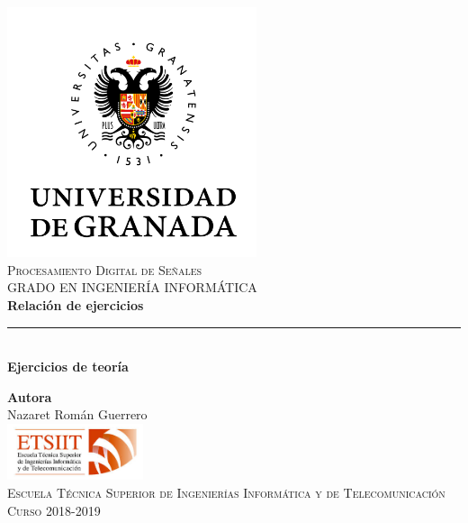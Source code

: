 \documentclass[11pt,a4paper]{article}
\begin{document}
\begin{titlepage}

\begin{minipage}{\textwidth}

\centering
\includegraphics[width=0.55\textwidth]{img/logo.png}\\

\textsc{\Large Procesamiento Digital de Señales\\[0.2cm]}
\textsc{GRADO EN INGENIERÍA INFORMÁTICA}\\[1cm]

{\Huge\bfseries Relación de ejercicios\\}
\noindent\rule[-1ex]{\textwidth}{3pt}\\[3.5ex]
{\large\bfseries Ejercicios de teoría}
\end{minipage}

\vspace{1.5cm}
\begin{minipage}{\textwidth}
\centering

\textbf{Autora}\\ {Nazaret Román Guerrero}\\[2.5ex]
\includegraphics[width=0.3\textwidth]{img/etsiit.jpeg}\\[0.1cm]
\vspace{1cm}
\textsc{Escuela Técnica Superior de Ingenierías Informática y de Telecomunicación}\\
\vspace{1cm}
\textsc{Curso 2018-2019}
\end{minipage}
\end{titlepage}
\end{document}
